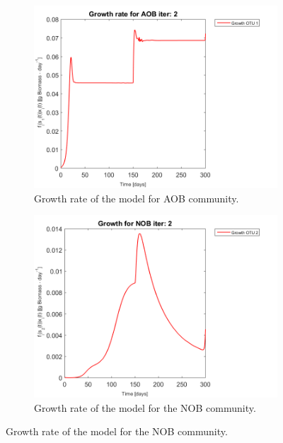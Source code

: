 \documentclass[3p,times]{article}
\begin{document}
\begin{figure}[h]
	\begin{subfigure}{0.45 \linewidth}
		\includegraphics[width=\linewidth]{proof_of_concept/250309_POC_try3_iter_2_growth_AOB_plot_1}
		\caption{Growth rate of the model for AOB community.}
		\label{AOB_growth_POC}
	\end{subfigure}
	\begin{subfigure}{0.45 \linewidth}
		\centering
		\includegraphics[width=\linewidth]{proof_of_concept/250309_POC_try3_iter_2_growth_NOB_plot_1}
	\caption{Growth rate of the model for the NOB community.}
	\label{NOB_growth_POC}
	\end{subfigure}


\end{figure}
\end{document}
